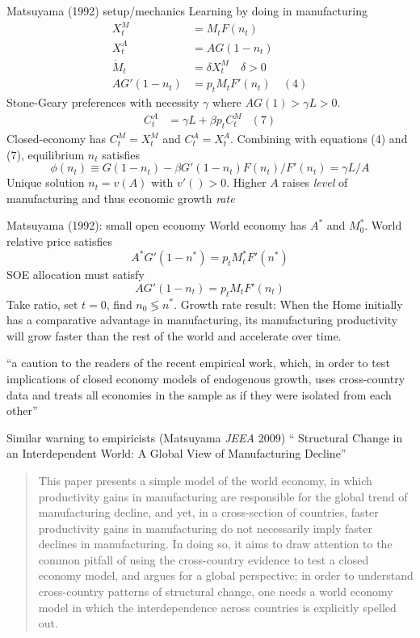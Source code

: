 \documentclass[10pt,notes=hide]{beamer}
\begin{document}
\begin{frame}{Matsuyama (1992) setup/mechanics}
Learning by doing in manufacturing
\begin{align*}
X_t^M 
&=
M_t F(n_t)
\\
X_t^A 
&=
A G(1-n_t)
\\
\dot{M}_t 
&=
\delta X_t^M \quad \delta>0
\\
A G'(1-n_t)
&=
p_t M_t F'(n_t)
&(4)
\end{align*}
Stone-Geary preferences with necessity $\gamma$ where $AG(1)>\gamma L > 0$.
\begin{align*}
C_t^A &= \gamma L + \beta p_t C_t^M 
& (7)
\end{align*}
Closed-economy has $C_t^M=X_t^M$ and $C_t^A=X_t^A$. Combining with equations (4) and (7), equilibrium $n_t$ satisfies
$$
\phi(n_t)
\equiv
G(1-n_t)-\beta G'(1-n_t)F(n_t)/F'(n_t)
=
\gamma L / A
$$
Unique solution $n_t = v(A)$ with $v'()>0$.
Higher $A$ raises \textit{level} of manufacturing and thus economic growth \textit{rate}
\end{frame}
\begin{frame}{Matsuyama (1992): small open economy}
World economy has $A^{*}$ and $M_{0}^{*}$.
World relative price satisfies
$$
A^{*} G'(1-n^{*})
=
p_t M_t^{*} F'(n^{*})
$$
SOE allocation must satisfy
$$
A G'(1-n_t)
=
p_t M_t F'(n_t)
$$
Take ratio, set $t=0$, find $n_0 \lessgtr n^{*}$.
\smallskip
Growth rate result: When the Home initially has a comparative advantage in manufacturing,
its manufacturing productivity will grow faster than the rest of the world
and accelerate over time.
\smallskip
{\small ``a caution to the readers of the recent empirical work, which, in order to test implications of closed economy models of endogenous growth,
uses cross-country data and treats all economies in the sample as if they were isolated from each other''\par}
\end{frame}
\begin{frame}{Similar warning to empiricists (Matsuyama \textit{JEEA} 2009)}
`` Structural Change in an Interdependent World: A Global View of Manufacturing Decline''
\begin{quote}
This paper presents a simple model of the world economy, in which productivity gains in manufacturing are responsible for the global trend of manufacturing decline, and yet, in a cross-section of countries, faster productivity gains in manufacturing do not necessarily imply faster declines in manufacturing.
In doing so, it aims to draw attention to the common pitfall of using the cross-country evidence to test a closed economy model, and argues for a global perspective; in order to understand cross-country patterns of structural change, one needs a world economy model in which the interdependence across countries is explicitly spelled out.
\end{quote}
\end{frame}
\end{document}
